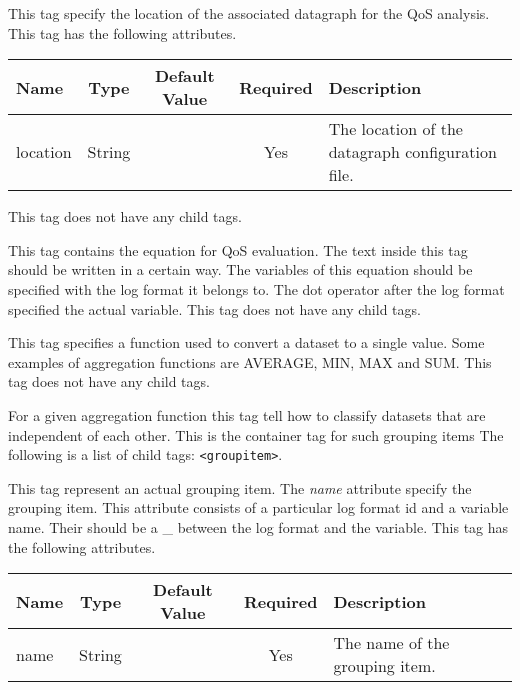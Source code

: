 This tag specify the location of the associated datagraph for the 
QoS analysis. This tag has the following attributes.

\begin{table}[h]
  \begin{tabular}{lcccl}
  \hline
  \textbf{Name} & \textbf{Type} & \textbf{Default Value} & \textbf{Required} & \textbf{Description} \\
  \hline
  location & String  & & Yes & The location of the datagraph configuration file. \\
  \end{tabular}
\end{table}

This tag does not have any child tags.


This tag contains the equation for QoS evaluation. The text inside 
this tag should be written in a certain way. The variables of this 
equation should be specified with the log format it belongs to. The 
dot operator after the log format specified the actual variable. This tag 
does not have any child tags.


This tag specifies a function used to convert a dataset to a single 
value. Some examples of aggregation functions are AVERAGE, 
MIN, MAX and SUM. This tag does not have any child tags.


For a given aggregation function this tag tell how to classify 
datasets that are independent of each other. This is the 
container tag for such grouping items
The following is a list of child tags: \texttt{<groupitem>}. 


This tag represent an actual grouping item. The \textit{name} 
attribute specify the grouping item. This attribute consists of 
a particular log format id and a variable name. Their should be a 
\_ between the log format and the variable. This tag has the 
following attributes. 
\begin{table}
 \begin{tabular}{lcccl}
  \hline
  \textbf{Name} & \textbf{Type} & \textbf{Default Value} & \textbf{Required} & \textbf{Description} \\
  \hline
  name & String  & & Yes & The name of the grouping item. \\
  \end{tabular}
\end{table}

